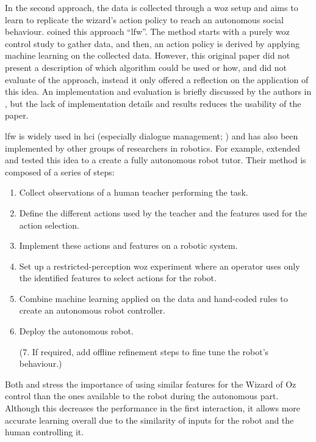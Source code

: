     In the second approach, the data is collected through a \gls{woz} setup and aims to learn to replicate the wizard's action policy to reach an autonomous social behaviour. \cite{knox2014learning} coined this approach ``\gls{lfw}''. The method starts with a purely \gls{woz} control study to gather data, and then, an action policy is derived by applying machine learning on the collected data. However, this original paper did not present a description of which algorithm could be used or how, and did not evaluate of the approach, instead it only offered a reflection on the application of this idea. An implementation and evaluation is briefly discussed by the authors in \cite{knox2016learning}, but the lack of implementation details and results reduces the usability of the paper.
    
    \gls{lfw} is widely used in \gls{hci} (especially dialogue management; \citealt{rieser2008learning}) and has also been implemented by other groups of researchers in robotics. For example, \citet{sequeira2016discovering} extended and tested this idea to a create a fully autonomous robot tutor. Their method is composed of a series of steps: 
    \begin{enumerate}
    	\item Collect observations of a human teacher performing the task.
    	\item Define the different actions used by the teacher and the features used for the action selection.
    	\item Implement these actions and features on a robotic system.
    	\item Set up a restricted-perception \gls{woz} experiment where an operator uses only the identified features to select actions for the robot.
    	\item Combine machine learning applied on the data and hand-coded rules to create an autonomous robot controller.
    	\item Deploy the autonomous robot.
    	\item[(7.] If required, add offline refinement steps to fine tune the robot's behaviour.)
    \end{enumerate}

    Both \citet{knox2014learning} and \citet{sequeira2016discovering} stress the importance of using similar features for the Wizard of Oz control than the ones available to the robot during the autonomous part. Although this decreases the performance in the first interaction, it allows more accurate learning overall due to the similarity of inputs for the robot and the human controlling it.
        
